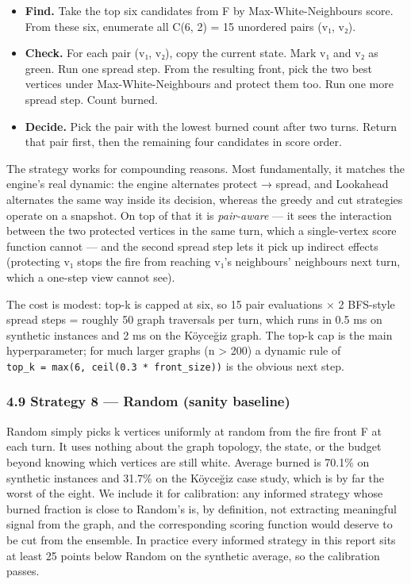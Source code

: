 \documentclass[
  11pt,
]{article}
\providecommand{\tightlist}{%
  \setlength{\itemsep}{0pt}\setlength{\parskip}{0pt}}
\begin{document}
\begin{itemize}
\tightlist
\item
  \textbf{Find.} Take the top six candidates from F by
  Max-White-Neighbours score. From these six, enumerate all C(6, 2) = 15
  unordered pairs (v₁, v₂).
\item
  \textbf{Check.} For each pair (v₁, v₂), copy the current state. Mark
  v₁ and v₂ as green. Run one spread step. From the resulting front,
  pick the two best vertices under Max-White-Neighbours and protect them
  too. Run one more spread step. Count burned.
\item
  \textbf{Decide.} Pick the pair with the lowest burned count after two
  turns. Return that pair first, then the remaining four candidates in
  score order.
\end{itemize}

The strategy works for compounding reasons. Most fundamentally, it
matches the engine's real dynamic: the engine alternates protect →
spread, and Lookahead alternates the same way inside its decision,
whereas the greedy and cut strategies operate on a snapshot. On top of
that it is \emph{pair-aware} --- it sees the interaction between the two
protected vertices in the same turn, which a single-vertex score
function cannot --- and the second spread step lets it pick up indirect
effects (protecting v₁ stops the fire from reaching v₁'s neighbours'
neighbours next turn, which a one-step view cannot see).

The cost is modest: top-k is capped at six, so 15 pair evaluations × 2
BFS-style spread steps = roughly 50 graph traversals per turn, which
runs in 0.5 ms on synthetic instances and 2 ms on the Köyceğiz graph.
The top-k cap is the main hyperparameter; for much larger graphs (n
\textgreater{} 200) a dynamic rule of
\texttt{top\_k\ =\ max(6,\ ceil(0.3\ *\ front\_size))} is the obvious
next step.

\subsubsection{4.9 Strategy 8 --- Random (sanity
baseline)}\label{strategy-8-random-sanity-baseline}

Random simply picks k vertices uniformly at random from the fire front F
at each turn. It uses nothing about the graph topology, the state, or
the budget beyond knowing which vertices are still white. Average burned
is 70.1\% on synthetic instances and 31.7\% on the Köyceğiz case study,
which is by far the worst of the eight. We include it for calibration:
any informed strategy whose burned fraction is close to Random's is, by
definition, not extracting meaningful signal from the graph, and the
corresponding scoring function would deserve to be cut from the
ensemble. In practice every informed strategy in this report sits at
least 25 points below Random on the synthetic average, so the
calibration passes.
\end{document}
